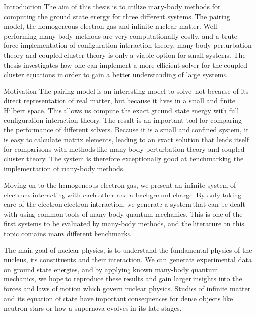 \documentclass[twoside,english]{uiofysmaster}
\begin{document}
\tableofcontents


\begin{chapter}{Introduction}
	The aim of this thesis is to utilize many-body methods for
        computing the ground state energy for three different
        systems. The pairing model, the homogeneous electron gas and
        infinite nuclear matter. Well-performing many-body methods
        are very computationally costly, and a brute force
        implementation of configuration interaction theory, many-body perturbation
        theory and coupled-cluster theory is only a viable
        option for small systems. The thesis investigates how one can
        implement a more efficient solver for the coupled-cluster
         equations in order to gain a better  understanding of large systems.

	\begin{subsection}{Motivation}
		The pairing model is an interesting model to solve,
                not because of its direct representation of real
                matter, but because it lives in a small and finite
                Hilbert space. This allows us compute the exact ground
                state energy with full configuration interaction
                theory. The result is an important tool for comparing
                the performance of different solvers. Because it is a
                small and confined system, it is easy to calculate
                matrix elements, leading to an exact solution that
                lends itself for comparisons with methods like
                many-body perturbation theory and coupled-cluster
                theory. The system is therefore exceptionally good at
                benchmarking the implementation of many-body methods.

		Moving on to the homogeneous electron gas, we present
                an infinite system of electrons interacting with each
                other and a background charge. By only taking care of
                the electron-electron interaction, we generate a system
                that can be dealt with using common tools of many-body
                quantum mechanics. This is one of the first systems to
                be evaluated by many-body methods, and the literature
                on this topic contains many different benchmarks.


		The main goal of nuclear physics, is to understand the
                fundamental physics of the nucleus, its constituents
                and their interaction. We can generate experimental
                data on ground state energies, and by applying
                known many-body quantum mechanics, we hope to
                reproduce these results and gain larger insights into
                the forces and laws of motion which govern nuclear physics. 
                Studies of infinite matter and its equation of state have important consequences for 
dense objects like neutron stars or how a supernova evolves in its late stages.


\end{subsection}
\end{chapter}
\end{document}
